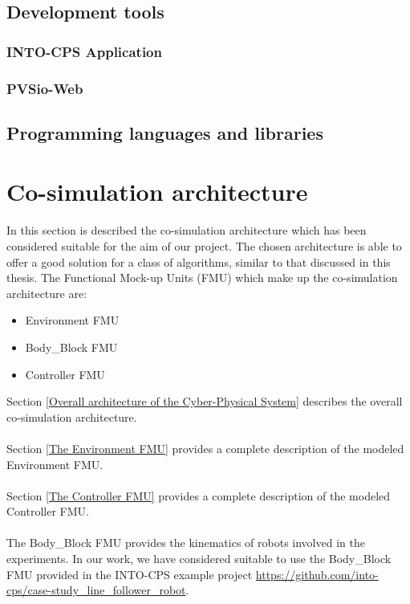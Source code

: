 \documentclass[english]{article}
\begin{document}
\subsection{Development tools}
\label{Development tools and simulation environment}

\subsubsection{INTO-CPS Application}
\label{INTO-CPS Application}

\subsubsection{PVSio-Web}
\label{PVSio-Web}

\subsection{Programming languages and libraries}
\label{Programming languages and libraries}

\section{Co-simulation architecture}
\label{Co-simulation architecture}
In this section is described the co-simulation architecture which has been considered suitable for the aim of our project. The chosen architecture is able to offer a good solution for a class of algorithms, similar to that discussed in this thesis. The Functional Mock-up Units (FMU) which make up the co-simulation architecture are:
\begin{itemize}
	\item Environment FMU
	\item Body\_Block FMU
	\item Controller FMU
\end{itemize}
\noindent Section \ref{Overall architecture of the Cyber-Physical System} describes the overall co-simulation architecture.\\
\\ Section \ref{The Environment FMU} provides a complete description of the modeled Environment FMU.\\
\\Section \ref{The Controller FMU} provides a complete description of the modeled Controller FMU.\\
\\The Body\_Block FMU provides the kinematics of robots involved in the experiments. In our work, we have considered suitable to use the Body\_Block FMU provided in the INTO-CPS example project \url{https://github.com/into-cps/case-study_line_follower_robot}.  
\end{document}
